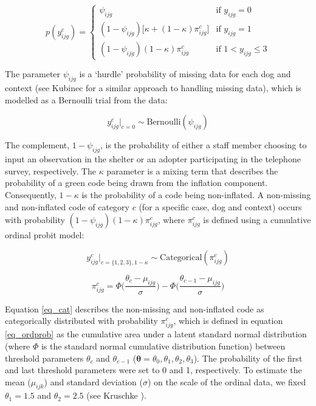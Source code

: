 \documentclass[fleqn,10pt]{wlscirep}
\begin{document}
\begin{equation}
  p(y_{ijg}^{c}) =
  \begin{cases}
      \psi_{ijg} & \text{if } y_{ijg} = 0 \\
      (1-\psi_{ijg})\big[\kappa + (1-\kappa)\pi_{ijg}^c\big]
      & \text{if } y_{ijg} = 1 \\
      (1-\psi_{ijg})(1-\kappa)\pi_{ijg}^c
      & \text{if } 1 < y_{ijg} \leq 3
  \end{cases}
  \label{eq_mixture}
\end{equation}

The parameter $\psi_{ijg}$ is a ‘hurdle’ probability of missing data for each dog and context (see Kubinec  \cite{kubinec2019} for a similar approach to handling missing data), which is modelled as a Bernoulli trial from the data:

\begin{equation}
  y_{ijg}^{c} \big|_{c=0} \sim \text{Bernoulli}(\psi_{ijg})
  \label{eq_missing}
\end{equation}

The complement, $1 - \psi_{ijg}$, is the probability of either a staff member choosing to input an observation in the shelter or an adopter participating in the telephone survey, respectively. The $\kappa$ parameter is a mixing term that describes the probability of a green code being drawn from the inflation component. Consequently,  $1 - \kappa$ is the probability of a code being non-inflated. A non-missing and non-inflated code of category $c$ (for a specific case, dog and context) occurs with probability $(1-\psi_{ijg})(1-\kappa)\pi_{ijg}^c$, where $\pi_{ijg}^c$ is defined using a cumulative ordinal probit model:

\begin{equation}
  y_{ijg}^{c} \big|_{c=\{1,2,3\}, 1 - \kappa} \sim \text{Categorical}(\pi_{ijg}^c)
  \label{eq_cat}
\end{equation}

\begin{equation}
  \pi_{ijg}^c = \Phi \Big( \frac{\theta_{c} - \mu_{ijg}}{\sigma} \Big) - \Phi \Big( \frac{\theta_{c-1} - \mu_{ijg}}{\sigma} \Big)
  \label{eq_ordprob}
\end{equation}

Equation \ref{eq_cat} describes the non-missing and non-inflated code as categorically distributed with probability $\pi_{ijg}^c$, which is defined in equation \ref{eq_ordprob} as the cumulative area under a latent standard normal distribution (where $\Phi$ is the standard normal cumulative distribution function) between threshold parameters $\theta_{c}$ and $\theta_{c-1}$ ($\boldsymbol{\theta} = {\theta_{0}, \theta_{1}, \theta_{2}, \theta_{3}}$). The probability of the first and last threshold parameters were set to 0 and 1, respectively. To estimate the mean ($\mu_{ijk}$) and standard deviation ($\sigma$) on the scale of the ordinal data, we fixed $\theta_{1} = 1.5$ and $\theta_{2} = 2.5$ (see Kruschke \cite{kruschke2014}).
\end{document}
